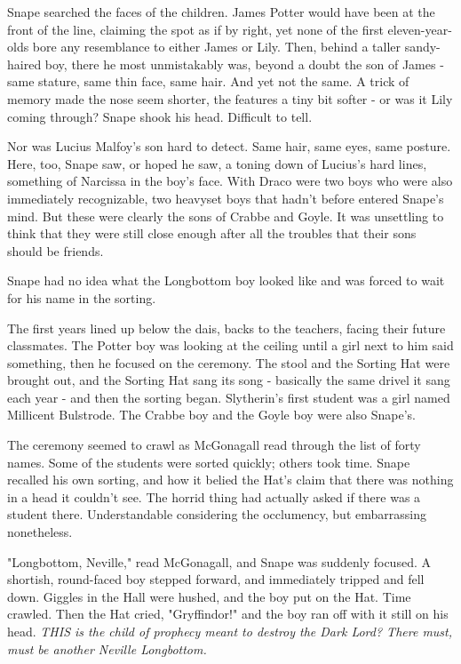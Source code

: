 Snape searched the faces of the children. James Potter would have been at the front of the line, claiming the spot as if by right, yet none of the first eleven-year-olds bore any resemblance to either James or Lily. Then, behind a taller sandy-haired boy, there he most unmistakably was, beyond a doubt the son of James - same stature, same thin face, same hair. And yet not the same. A trick of memory made the nose seem shorter, the features a tiny bit softer - or was it Lily coming through? Snape shook his head. Difficult to tell.

Nor was Lucius Malfoy's son hard to detect. Same hair, same eyes, same posture. Here, too, Snape saw, or hoped he saw, a toning down of Lucius's hard lines, something of Narcissa in the boy's face. With Draco were two boys who were also immediately recognizable, two heavyset boys that hadn't before entered Snape's mind. But these were clearly the sons of Crabbe and Goyle. It was unsettling to think that they were still close enough after all the troubles that their sons should be friends.

Snape had no idea what the Longbottom boy looked like and was forced to wait for his name in the sorting.

The first years lined up below the dais, backs to the teachers, facing their future classmates. The Potter boy was looking at the ceiling until a girl next to him said something, then he focused on the ceremony. The stool and the Sorting Hat were brought out, and the Sorting Hat sang its song - basically the same drivel it sang each year - and then the sorting began. Slytherin's first student was a girl named Millicent Bulstrode. The Crabbe boy and the Goyle boy were also Snape's.

The ceremony seemed to crawl as McGonagall read through the list of forty names. Some of the students were sorted quickly; others took time. Snape recalled his own sorting, and how it belied the Hat's claim that there was nothing in a head it couldn't see. The horrid thing had actually asked if there was a student there. Understandable considering the occlumency, but embarrassing nonetheless.

"Longbottom, Neville," read McGonagall, and Snape was suddenly focused. A shortish, round-faced boy stepped forward, and immediately tripped and fell down. Giggles in the Hall were hushed, and the boy put on the Hat. Time crawled. Then the Hat cried, "Gryffindor!" and the boy ran off with it still on his head. \emph{THIS is the child of prophecy meant to destroy the Dark Lord? There must, must be another Neville Longbottom.}

